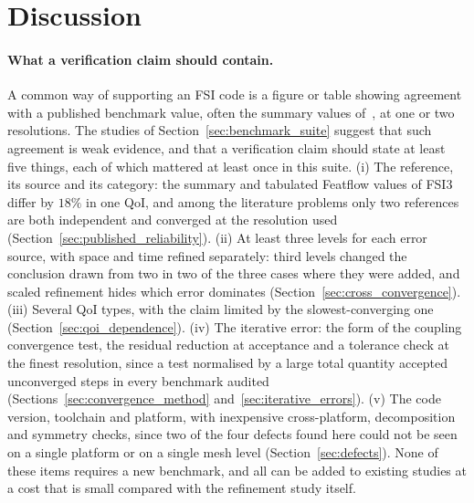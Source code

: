 \section{Discussion}\label{sec:discussion}

\paragraph{What a verification claim should contain.}
A common way of supporting an FSI code is a figure or table showing agreement with a published benchmark value, often the summary values of~\citet{Turek2006}, at one or two resolutions.
The studies of Section~\ref{sec:benchmark_suite} suggest that such agreement is weak evidence, and that a verification claim should state at least five things, each of which mattered at least once in this suite.
(i) The reference, its source and its category: the summary and tabulated Featflow values of FSI3 differ by $18\%$ in one QoI, and among the literature problems only two references are both independent and converged at the resolution used (Section~\ref{sec:published_reliability}).
(ii) At least three levels for each error source, with space and time refined separately: third levels changed the conclusion drawn from two in two of the three cases where they were added, and scaled refinement hides which error dominates (Section~\ref{sec:cross_convergence}).
(iii) Several QoI types, with the claim limited by the slowest-converging one (Section~\ref{sec:qoi_dependence}).
(iv) The iterative error: the form of the coupling convergence test, the residual reduction at acceptance and a tolerance check at the finest resolution, since a test normalised by a large total quantity accepted unconverged steps in every benchmark audited (Sections~\ref{sec:convergence_method} and~\ref{sec:iterative_errors}).
(v) The code version, toolchain and platform, with inexpensive cross-platform, decomposition and symmetry checks, since two of the four defects found here could not be seen on a single platform or on a single mesh level (Section~\ref{sec:defects}).
None of these items requires a new benchmark, and all can be added to existing studies at a cost that is small compared with the refinement study itself.

